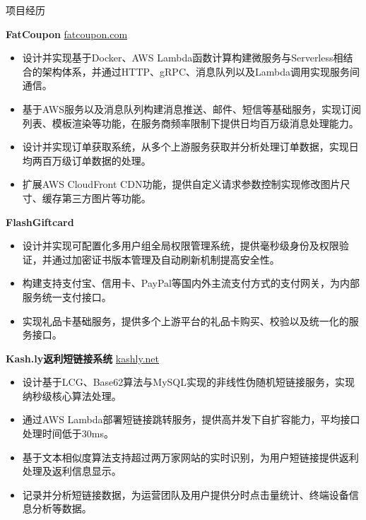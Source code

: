 \documentclass{resume} %
\begin{document}
\begin{rSection}{项目经历}
  \vspace{-1.25em}

  \item \textbf{FatCoupon} {} \hfill \href{https://fatcoupon.com}{fatcoupon.com}
  \begin{itemize}
    \itemsep -3pt {}
    \item 设计并实现基于Docker、AWS Lambda函数计算构建微服务与Serverless相结合的架构体系，并通过HTTP、gRPC、消息队列以及Lambda调用实现服务间通信。
    \item 基于AWS服务以及消息队列构建消息推送、邮件、短信等基础服务，实现订阅列表、模板渲染等功能，在服务商频率限制下提供日均百万级消息处理能力。
    \item 设计并实现订单获取系统，从多个上游服务获取并分析处理订单数据，实现日均两百万级订单数据的处理。
    \item 扩展AWS CloudFront CDN功能，提供自定义请求参数控制实现修改图片尺寸、缓存第三方图片等功能。
  \end{itemize}

  \item \textbf{FlashGiftcard} {}
  \begin{itemize}
    \itemsep -3pt {}
    \item 设计并实现可配置化多用户组全局权限管理系统，提供毫秒级身份及权限验证，并通过加密证书版本管理及自动刷新机制提高安全性。
    \item 构建支持支付宝、信用卡、PayPal等国内外主流支付方式的支付网关，为内部服务统一支付接口。
    \item 实现礼品卡基础服务，提供多个上游平台的礼品卡购买、校验以及统一化的服务接口。
  \end{itemize}

  \item \textbf{Kash.ly返利短链接系统} {} \hfill \href{https://kashly.net}{kashly.net}
  \begin{itemize}
    \itemsep -3pt {}
    \item 设计基于LCG、Base62算法与MySQL实现的非线性伪随机短链接服务，实现纳秒级核心算法处理。
    \item 通过AWS Lambda部署短链接跳转服务，提供高并发下自扩容能力，平均接口处理时间低于30ms。
    \item 基于文本相似度算法支持超过两万家网站的实时识别，为用户短链接提供返利处理及返利信息显示。
    \item 记录并分析短链接数据，为运营团队及用户提供分时点击量统计、终端设备信息分析等数据。
  \end{itemize}


\end{rSection}
\end{document}
